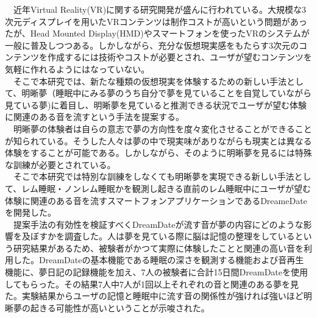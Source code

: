 
\begin{jabstract}
　近年Virtual Reality(VR)に関する研究開発が盛んに行われている。大規模な3次元ディスプレイを用いたVRコンテンツは制作コストが高いという問題があったが、Head Mounted Display(HMD)やスマートフォンを使ったVRのシステムが一般に普及しつつある。しかしながら、充分な仮想現実感をもたらす3次元のコンテンツを作成するには技術やコストが必要とされ、ユーザが望むコンテンツを気軽に作れるようにはなっていない。\\
　そこで本研究では、新たな種類の仮想現実を体験するための新しい手法として、明晰夢（睡眠中にみる夢のうち自分で夢を見ていることを自覚していながら見ている夢)に着目し、明晰夢を見ていると推測できる状況でユーザが望む体験に関連のある音を流すという手法を提案する。\\
　明晰夢の体験者は自らの意志で夢の方向性を度々変化させることができることが知られている。そうした人々は夢の中で現実味がありながらも現実とは異なる体験をすることが可能である。しかしながら、そのように明晰夢を見るには特殊な訓練が必要とされている。 \\
　そこで本研究では特別な訓練をしなくても明晰夢を実現できる新しい手法として、レム睡眠・ノンレム睡眠かを観測し起きる直前のレム睡眠中にユーザが望む体験に関連のある音を流すスマートフォンアプリケーションであるDreameDateを開発した。\\
　提案手法の有効性を検証すべくDreamDateが流す音が夢の内容にどのような影響を及ぼすかを調査した。人は夢を見ている際に脳は記憶の整理をしているという研究結果があるため、被験者がかつて実際に体験したことと関連の高い音を利用した。DreamDateの基本機能である睡眠の深さを観測する機能および音再生機能に、夢日記の記録機能を加え、7人の被験者に合計15日間DreamDateを使用してもらった。その結果7人中7人が1回以上それぞれの音と関連のある夢を見た。実験結果からユーザの記憶と睡眠中に流す音の関係性が強ければ強いほど明晰夢の起きる可能性が高いということが示唆された。


\end{jabstract}
